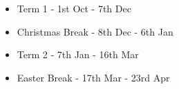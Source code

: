 \documentclass[12pt]{article}
\begin{document}
\begin{flushleft}

    \begin{itemize}
        \item Term 1 - 1st Oct - 7th Dec
        \item Christmas Break - 8th Dec - 6th Jan
        \columnbreak
        \item Term 2 - 7th Jan - 16th Mar
        \item Easter Break - 17th Mar - 23rd Apr
    \end{itemize}

\end{flushleft}
\end{document}
